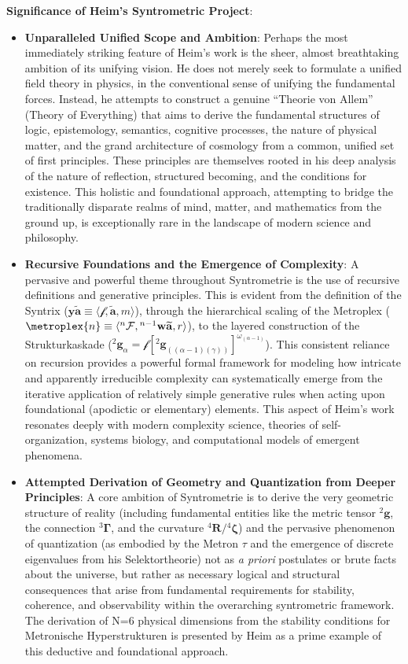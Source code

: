 \documentclass[
    12pt,              %
    a4paper,           %
    headings=normal,   %
    twoside=true,      %
    BCOR=8mm,          %
]{scrbook}
\newcommand{\syntrix}{\bm{y\widetilde{a}}}
\newcommand{\metrophor}{\bm{\widetilde{a}}}
\newcommand{\synkolator}{\mathcal{f}}
\newcommand{\synkolationsstufe}{m}
\newcommand{\hypermetrophor}[1]{{}^{#1}\mathbf{w\widetilde{a}}}
\newcommand{\metroplexsynkolator}[1]{{}^{#1}\mathcal{F}}
\newcommand{\kompositionsfeld}{{}^2\mathbf{g}}
\newcommand{\partialstruktur}[1]{{}^2\mathbf{g}_{(#1)}}
\newcommand{\fundamentalkondensor}{{}^3\bm{\Gamma}}
\newcommand{\metron}{\tau}
\newcommand{\strukturkompressor}{{}^4\bm{\zeta}}
\begin{document}
\textbf{Significance of Heim's Syntrometric Project}:
\begin{itemize}
    \item \textbf{Unparalleled Unified Scope and Ambition}: Perhaps the most immediately striking feature of Heim's work is the sheer, almost breathtaking ambition of its unifying vision. He does not merely seek to formulate a unified field theory in physics, in the conventional sense of unifying the fundamental forces. Instead, he attempts to construct a genuine \enquote{Theorie von Allem} (Theory of Everything) that aims to derive the fundamental structures of logic, epistemology, semantics, cognitive processes, the nature of physical matter, and the grand architecture of cosmology from a common, unified set of first principles. These principles are themselves rooted in his deep analysis of the nature of reflection, structured becoming, and the conditions for existence. This holistic and foundational approach, attempting to bridge the traditionally disparate realms of mind, matter, and mathematics from the ground up, is exceptionally rare in the landscape of modern science and philosophy.
    \item \textbf{Recursive Foundations and the Emergence of Complexity}: A pervasive and powerful theme throughout Syntrometrie is the use of recursive definitions and generative principles. This is evident from the definition of the Syntrix (\( \syntrix \equiv \langle \synkolator, \metrophor, \synkolationsstufe \rangle \)), through the hierarchical scaling of the Metroplex (\( \metroplex{n} \equiv \langle \metroplexsynkolator{n}, \hypermetrophor{n-1}, r \rangle \)), to the layered construction of the Strukturkaskade (\( \kompositionsfeld_\alpha = \mathcal{f}[\partialstruktur{(\alpha-1)(\gamma)}]^{\omega_{(\alpha-1)}} \)). This consistent reliance on recursion provides a powerful formal framework for modeling how intricate and apparently irreducible complexity can systematically emerge from the iterative application of relatively simple generative rules when acting upon foundational (apodictic or elementary) elements. This aspect of Heim's work resonates deeply with modern complexity science, theories of self-organization, systems biology, and computational models of emergent phenomena.
    \item \textbf{Attempted Derivation of Geometry and Quantization from Deeper Principles}: A core ambition of Syntrometrie is to derive the very geometric structure of reality (including fundamental entities like the metric tensor \( \kompositionsfeld \), the connection \( \fundamentalkondensor \), and the curvature \( {}^4\mathbf{R}/\strukturkompressor \)) and the pervasive phenomenon of quantization (as embodied by the Metron \( \metron \) and the emergence of discrete eigenvalues from his Selektortheorie) not as \textit{a priori} postulates or brute facts about the universe, but rather as necessary logical and structural consequences that arise from fundamental requirements for stability, coherence, and observability within the overarching syntrometric framework. The derivation of N=6 physical dimensions from the stability conditions for Metronische Hyperstrukturen is presented by Heim as a prime example of this deductive and foundational approach.

\end{itemize}
\end{document}
